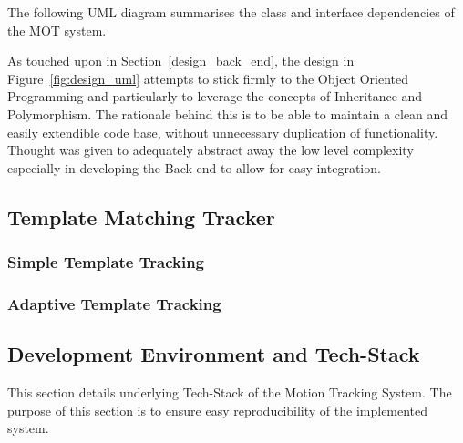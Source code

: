 The following UML diagram summarises the class and interface dependencies of the
MOT system.

\newpage
{} 
\newpage
As touched upon in Section~\ref{design_back_end}, the design in
Figure~\ref{fig:design_uml} attempts to stick firmly to the Object Oriented
Programming and particularly to leverage the concepts of Inheritance and
Polymorphism. The rationale behind this is to be able to maintain a clean and
easily extendible code base, without unnecessary duplication of functionality.
Thought was given to adequately abstract away the low level complexity
especially in developing the Back-end to allow for easy integration. 



\subsection{Template Matching Tracker}

\subsubsection{Simple Template Tracking}

\subsubsection{Adaptive Template Tracking}


\subsection{Development Environment and Tech-Stack}
This section details underlying Tech-Stack of the Motion Tracking System. The
purpose of this section is to ensure easy reproducibility of the implemented
system.






